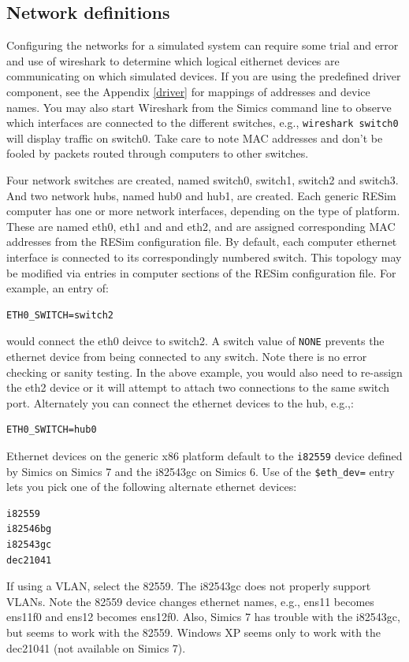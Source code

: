 \documentclass[titlepage]{article}
\begin{document}
\subsection{Network definitions}
\label{networks}
Configuring the networks for a simulated system can require some trial and error and use of wireshark to determine which
logical eithernet devices are communicating on which simulated devices.  If you are using the predefined driver component, see the 
Appendix \ref{driver} for mappings of addresses and device names.  You may also start Wireshark from the Simics command line to 
observe which interfaces are connected to the different switches, e.g., {\tt wireshark switch0} will display traffic on switch0.
Take care to note MAC addresses and don't be fooled by packets routed through computers to other switches.

Four network switches are created, named switch0, switch1, switch2 and switch3. And two network hubs, named hub0 and hub1, are created.  
Each generic RESim computer has one or more network interfaces,
depending on the type of platform.
These are named eth0, eth1 and and eth2, and are assigned corresponding MAC addresses from the
RESim configuration file. By default, each computer ethernet interface is connected to its correspondingly numbered switch.
This topology may be modified via entries in computer sections of the RESim configuration file.  For example, an entry of:
\begin{verbatim}
ETH0_SWITCH=switch2
\end{verbatim}
\noindent would connect the eth0 deivce to switch2.  A switch value of {\tt NONE} prevents the ethernet device from being connected
to any switch.  Note there is no error checking or sanity testing.  In the above example, you would also need to re-assign the eth2 device
or it will attempt to attach two connections to the same switch port.
Alternately you can connect the ethernet devices to the hub, e.g.,:
\begin{verbatim}
ETH0_SWITCH=hub0
\end{verbatim}

Ethernet devices on the generic x86 platform default to the {\tt i82559} device defined by Simics on Simics 7 and the i82543gc on Simics 6.  Use of the {\tt \$eth\_dev=} 
entry lets you pick one of the following alternate ethernet devices:
\begin{verbatim}
i82559
i82546bg
i82543gc
dec21041
\end{verbatim}

If using a VLAN, select the 82559.  The i82543gc does not properly support VLANs.
Note the 82559 device changes ethernet names, e.g., ens11 becomes ens11f0 and ens12 becomes ens12f0.
Also, Simics 7 has trouble with the i82543gc, but seems to work with the 82559.
Windows XP seems only to work with the dec21041 (not available on Simics 7).
\end{document}
